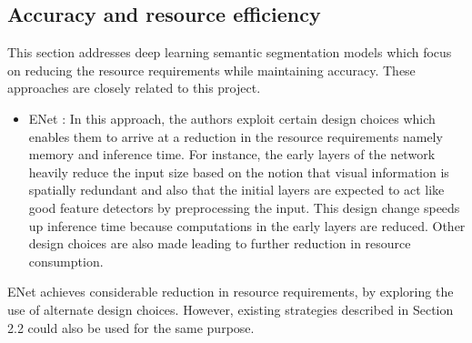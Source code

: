 \documentclass[a4paper,12pt]{article}
\begin{document}
\subsection{Accuracy and resource efficiency}
This section addresses deep learning semantic segmentation models which focus on reducing the resource requirements while maintaining accuracy. These approaches are closely related to this project. 
\begin{itemize}
	\item ENet \cite{11}: In this approach, the authors exploit certain design choices which enables them to arrive at a reduction in the resource requirements namely memory and inference time. For instance, the early layers of the network heavily reduce the input size based on the notion that visual information is spatially redundant and also that the initial layers are expected to act like good feature detectors by preprocessing the input. This design change speeds up inference time because computations in the early layers are reduced. Other design choices are also made leading to further reduction in resource consumption.
\end{itemize}

ENet achieves considerable reduction in resource requirements, by exploring the use of alternate design choices. However, existing strategies described in Section 2.2 could also be used for the same purpose.
\end{document}
